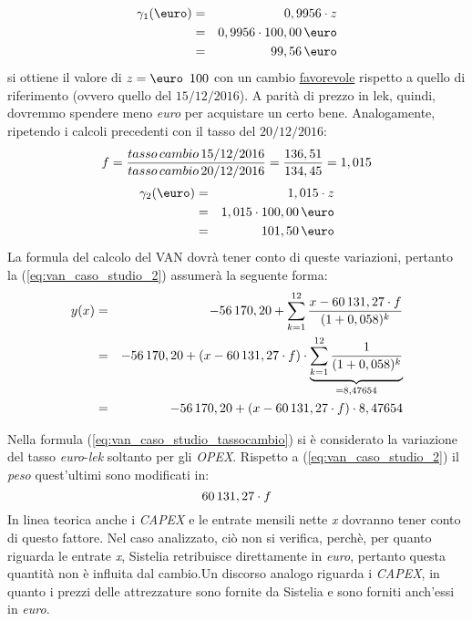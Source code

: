 \begin{eqnarray}
\label{eq:euro_example1}
	\gamma _1 (\mbox{\euro})& = & 0,9956 \cdot z 	\nonumber \\
			  & = & 0,9956 \cdot 100,00 \thinspace \mbox{\euro} \nonumber \\
			  & = & 99,56 \thinspace \mbox{\euro}
\end{eqnarray}
si ottiene il valore di $z = \mbox{\euro \thinspace 100}$ con un cambio \underline{favorevole} rispetto a quello di riferimento (ovvero quello del $15/12/2016$). A parità di prezzo in lek, quindi, dovremmo spendere meno \textit{euro} per acquistare un certo bene.\newline
Analogamente, ripetendo i calcoli precedenti con il tasso del $20/12/2016$:
\begin{equation}
\label{eq:example_2_fattore_aggiustamento}
\begin{split}
	f = \frac{tasso \thinspace cambio \thinspace 15/12/2016}{tasso \thinspace cambio \thinspace 20/12/2016} = \frac{136,51}{134,45} = 1,015
\end{split}
\end{equation}
\begin{eqnarray}
\label{eq:euro_example2}
	\gamma _2 (\mbox{\euro})& = & 1,015 \cdot z 	\nonumber \\
			  & = & 1,015 \cdot 100,00 \thinspace \mbox{\euro} \nonumber \\
			  & = & 101,50 \thinspace \mbox{\euro}
\end{eqnarray}
La formula del calcolo del VAN dovrà tener conto di queste variazioni, pertanto la (\ref{eq:van_caso_studio_2}) assumerà la seguente forma:
	\begin{eqnarray}
	\label{eq:van_caso_studio_tassocambio}
 		y(x) & = & - 56\thinspace 170,20 + \sum_{k=1}^{12} \frac{x - 60\thinspace 131,27 \cdot f}{(1+0,058)^k} \nonumber \\
 		 & = & -56\thinspace 170,20 + (x - 60\thinspace 131,27 \cdot f) \cdot \underbrace{\sum_{k=1}^{12} \frac{1} {(1+0,058)^{k}}}_{{}=8,47654} \nonumber \\
 		 & = & -56\thinspace 170,20 + (x - 60\thinspace 131,27 \cdot f) \cdot 8,47654		
	\end{eqnarray}  		

	\begin{tcolorbox}[colframe=blue!75!black,adjusted title=\textbf{Osservazione!}]
		Nella formula (\ref{eq:van_caso_studio_tassocambio}) si è considerato la variazione del tasso \emph{euro}-\emph{lek} soltanto per gli \emph{\ac{OPEX}}. \newline Rispetto a (\ref{eq:van_caso_studio_2}) il \emph{peso} quest'ultimi sono modificati in:
		\[ 60\thinspace 131,27 \cdot f \] 
	In linea teorica anche i \emph{\ac{CAPEX}} e le entrate mensili nette \emph{x} dovranno tener conto di questo fattore. Nel caso analizzato, ciò non si verifica, perchè, per quanto riguarda le entrate \emph{x}, Sistelia retribuisce direttamente in \emph{euro}, pertanto questa quantità non è influita dal cambio.\newline Un discorso analogo riguarda i \emph{\ac{CAPEX}}, in quanto i prezzi delle attrezzature sono fornite da Sistelia e sono forniti anch'essi in \emph{euro}.
	\end{tcolorbox} 
